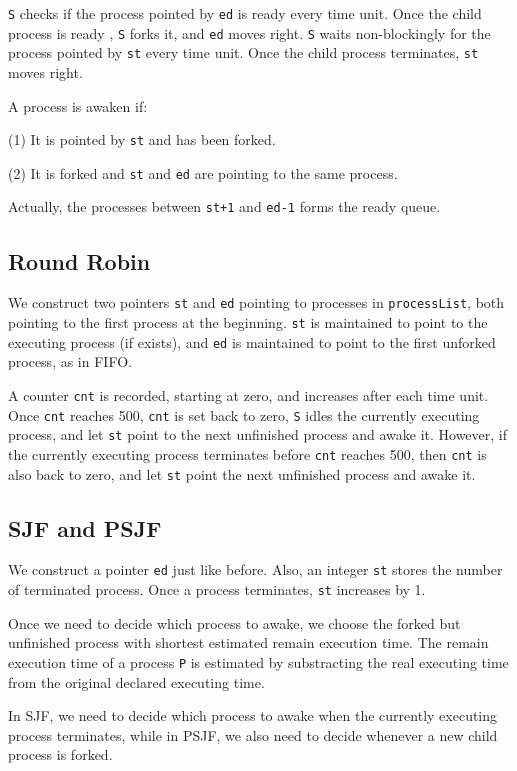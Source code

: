 \documentclass{article}
\begin{document}
        {\tt S} checks if the process pointed by {\tt ed} is ready every time unit. Once the child process is ready , {\tt S} forks it, and {\tt ed} moves right. {\tt S} waits non-blockingly for the process pointed by {\tt st} every time unit. Once the child process terminates, {\tt st} moves right.

        A process is awaken if: 

        (1) It is pointed by {\tt st} and has been forked.

        (2) It is forked and {\tt st} and {\tt ed} are pointing to the same process.

        Actually, the processes between {\tt st+1} and {\tt ed-1} forms the ready queue.

    \subsection{Round Robin}
        We construct two pointers {\tt st} and {\tt ed} pointing to processes in {\tt processList}, both pointing to the first process at the beginning. {\tt st} is maintained to point to the executing process (if exists), and {\tt ed} is maintained to point to the first unforked process, as in FIFO.

        A counter {\tt cnt} is recorded, starting at zero, and increases after each time unit. Once {\tt cnt} reaches 500, {\tt cnt} is set back to zero, {\tt S} idles the currently executing process, and let {\tt st} point to the next unfinished process and awake it. However, if the currently executing process terminates before {\tt cnt} reaches 500, then {\tt cnt} is also back to zero, and let {\tt st} point the next unfinished process and awake it.

    \subsection{SJF and PSJF}
        We construct a pointer {\tt ed} just like before. Also, an integer {\tt st} stores the number of terminated process. Once a process terminates, {\tt st} increases by 1.

        Once we need to decide which process to awake, we choose the forked but unfinished process with shortest estimated remain execution time. The remain execution time of a process {\tt P} is estimated by substracting the real executing time from the original declared executing time.
        
        In SJF, we need to decide which process to awake when the currently executing process terminates, while in PSJF, we also need to decide whenever a new child process is forked.
\end{document}
